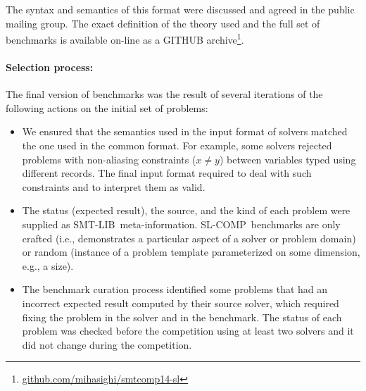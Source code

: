 \documentclass[twoside,11pt]{article}
\newcommand{\smtlib}{\textsf{SMT-LIB}}
\newcommand{\slcomp}{\textsf{SL-COMP}}
\begin{document}
The syntax and semantics of this format were discussed and agreed in the public mailing group. 
The exact definition of the theory used and the full set of benchmarks is available on-line as a GITHUB archive\footnote{\url{github.com/mihasighi/smtcomp14-sl}}.

\paragraph{Selection process:} The final version of benchmarks was the result of several iterations of the following actions on the initial set of problems:
\begin{itemize}
\item We ensured that the semantics used in the input format of solvers matched the one used in the common format. 
For example, some solvers rejected problems with non-aliasing constraints ($x\neq y$) between variables typed using different records. The final input format required to deal with such constraints and to interpret them as valid.

\item The status (expected result), the source, and the kind of each problem were supplied as \smtlib\ meta-information.
\slcomp\ benchmarks are only crafted (i.e., demonstrates a particular aspect of a solver or problem domain) or
random (instance of a problem template parameterized on some dimension, e.g., a size).

\item The benchmark curation process identified some problems that had an incorrect expected result computed by their source solver, which required fixing the problem in the solver and in the benchmark.
The status of each problem was checked before the competition using at least two solvers and it did not change during the competition. 
\end{itemize}
\end{document}
